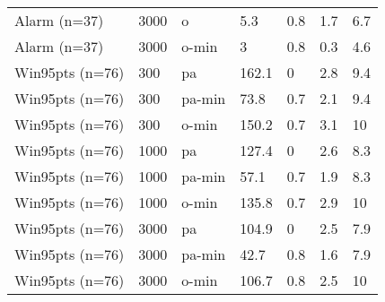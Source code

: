 \begin{table}[h]
\begin{tabular}{lllllll}
  Alarm (n=37) & 3000 & o & 5.3 & 0.8 & 1.7 & 6.7 \\ 
  Alarm (n=37) & 3000 & o-min & 3 & 0.8 & 0.3 & 4.6 \\ 
  Win95pts (n=76) & 300 & pa & 162.1 & 0 & 2.8 & 9.4 \\ 
  Win95pts (n=76) & 300 & pa-min & 73.8 & 0.7 & 2.1 & 9.4 \\ 
  Win95pts (n=76) & 300 & o-min & 150.2 & 0.7 & 3.1 & 10 \\ 
  Win95pts (n=76) & 1000 & pa & 127.4 & 0 & 2.6 & 8.3 \\ 
  Win95pts (n=76) & 1000 & pa-min & 57.1 & 0.7 & 1.9 & 8.3 \\ 
  Win95pts (n=76) & 1000 & o-min & 135.8 & 0.7 & 2.9 & 10 \\ 
  Win95pts (n=76) & 3000 & pa & 104.9 & 0 & 2.5 & 7.9 \\ 
  Win95pts (n=76) & 3000 & pa-min & 42.7 & 0.8 & 1.6 & 7.9 \\ 
  Win95pts (n=76) & 3000 & o-min & 106.7 & 0.8 & 2.5 & 10 \\ 
   \hline
\end{tabular}
\endgroup
\end{table}
